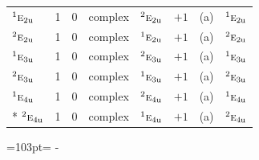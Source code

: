 \documentclass[10pt,a4paper]{article}
\newcommand{\needspace}[1]{\par\penalty-100\begingroup\dimen0=#1\relax\dimen2=\pagegoal
  \advance\dimen2-\pagetotal\ifdim\dimen0>\dimen2\relax\ifdim\dimen2>0pt\vfil\break\fi\fi
  \endgroup}
\numberwithin{equation}{section}
\newcommand{\irr}[1]{\text{\normalfont\scshape #1}}
\newcommand{\conjpair}[1]{{}^{#1}}
\newcommand{\ptag}[1]{\mathrm{#1}}
\begin{document}
{\begin{longtable}{@{}lrrllrll@{}}
$\conjpair{1}\irr{e}_{2\ptag{u}}$ & 1 & $0$ & complex & $\conjpair{2}\irr{e}_{2\ptag{u}}$ & $+1$ & (a) & $\conjpair{1}\irr{e}_{2\ptag{u}}$\\
$\conjpair{2}\irr{e}_{2\ptag{u}}$ & 1 & $0$ & complex & $\conjpair{1}\irr{e}_{2\ptag{u}}$ & $+1$ & (a) & $\conjpair{2}\irr{e}_{2\ptag{u}}$\\
$\conjpair{1}\irr{e}_{3\ptag{u}}$ & 1 & $0$ & complex & $\conjpair{2}\irr{e}_{3\ptag{u}}$ & $+1$ & (a) & $\conjpair{1}\irr{e}_{3\ptag{u}}$\\
$\conjpair{2}\irr{e}_{3\ptag{u}}$ & 1 & $0$ & complex & $\conjpair{1}\irr{e}_{3\ptag{u}}$ & $+1$ & (a) & $\conjpair{2}\irr{e}_{3\ptag{u}}$\\
$\conjpair{1}\irr{e}_{4\ptag{u}}$ & 1 & $0$ & complex & $\conjpair{2}\irr{e}_{4\ptag{u}}$ & $+1$ & (a) & $\conjpair{1}\irr{e}_{4\ptag{u}}$\\*
$\conjpair{2}\irr{e}_{4\ptag{u}}$ & 1 & $0$ & complex & $\conjpair{1}\irr{e}_{4\ptag{u}}$ & $+1$ & (a) & $\conjpair{2}\irr{e}_{4\ptag{u}}$\\
\bottomrule\end{longtable}}
\needspace{103pt}
\end{document}
